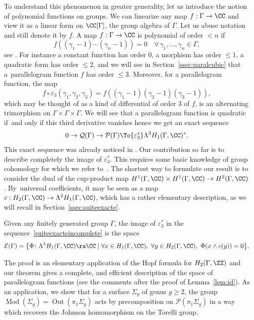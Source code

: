 To understand this phenomenon in greater generality, let us introduce the
notion of polynomial functions on groups. We can linearize any map
$f:\Gamma\to \CC$ and view it as a linear form on $\CC[\Gamma]$, the
group algebra of $\Gamma$. Let us abuse notation and still denote it by $f$.
A map $f:\Gamma\to\CC$ is polynomial of order $< n$ if
\[ f((\gamma_1-1)\cdots(\gamma_n-1))=0\quad
\forall \,\gamma_1,\ldots,\gamma_n\in \Gamma, \]
see \eg \cite[Chap.\,5]{Passi}.
For instance a constant function has order $0$, a morphism has order
$\leq 1$, a quadratic form
has order $\leq 2$, and we will see in Section~\ref{ssec:paralcubic}
that a~parallelogram function $f$ has order $\leq 3$.
Moreover, for a parallelogram function, the map
\[ f\circ\varepsilon_3(\gamma_1,\gamma_2,\gamma_3)=
f((\gamma_1-1)(\gamma_2-1)(\gamma_3-1)), \]
which may be thought of as a kind of differential of order 3 of $f$,
is an alternating trimorphism on
$\Gamma\times\Gamma\times\Gamma$.
We will see that a parallelogram function is quadratic if~and only if
this third derivative vanishes hence we get an exact sequence
\begin{equation}\label{suiteexacteincomplete}
0\to\mathcal{Q}(\Gamma)\to \mathcal{P}(\Gamma)\To
{\varepsilon_3^*} \Lambda^3 H_1(\Gamma,\CC)^*.
\end{equation}
This exact sequence was already noticed in \cite{Chenevier,FriisStetkaer}.
Our contribution so far is to describe completely the image of $\varepsilon_3^*$.
This requires some basic knowledge of group cohomology for which we refer
to~\cite{Brown}. The shortest way to formulate our result is to consider
the dual of the cup-product map
$H^1(\Gamma,\CC) \times H^1(\Gamma,\CC)\to H^2(\Gamma,\CC)$.
By~universal coefficients, it may be seen as a map
$c:H_2(\Gamma,\CC)\to \Lambda^2 H_1(\Gamma,\CC)$,
which has a rather elementary description, as we will recall
in Section~\ref{ssec:suiteexacte}.
\begin{theorem}\label{theo:parallel}
Given any finitely generated group $\Gamma$, the image of
$\varepsilon_3^*$ in the sequence~\eqref{suiteexacteincomplete} is the
space
\[\mathcal{E}(\Gamma)=\bigl\lbrace
\Phi\colon\Lambda^3H_1(\Gamma,\CC)\ra\CC\mid\forall x\in H_1(\Gamma,\CC),\
\forall y\in H_2(\Gamma,\CC),\ \Phi(x\wedge c(y))=0
\bigr\rbrace. \]
\end{theorem}
The proof is an elementary application of the Hopf formula for
$H_2(\Gamma,\ZZ)$ and our theorem gives a complete, and efficient
description of the space of parallelogram functions (see the comments
after the proof of Lemma~\ref{lem:id}).
As an application, we show that for a surface $\Sigma_g$ of genus $g\geq 2$,
the group
$\operatorname{Mod}(\Sigma_g)=\operatorname{Out}(\pi_1 \Sigma_g)$ acts by
precomposition on $\mathcal{P}(\pi_1\Sigma_g)$ in a way which recovers
the Johnson homomorphism on the Torelli group.

